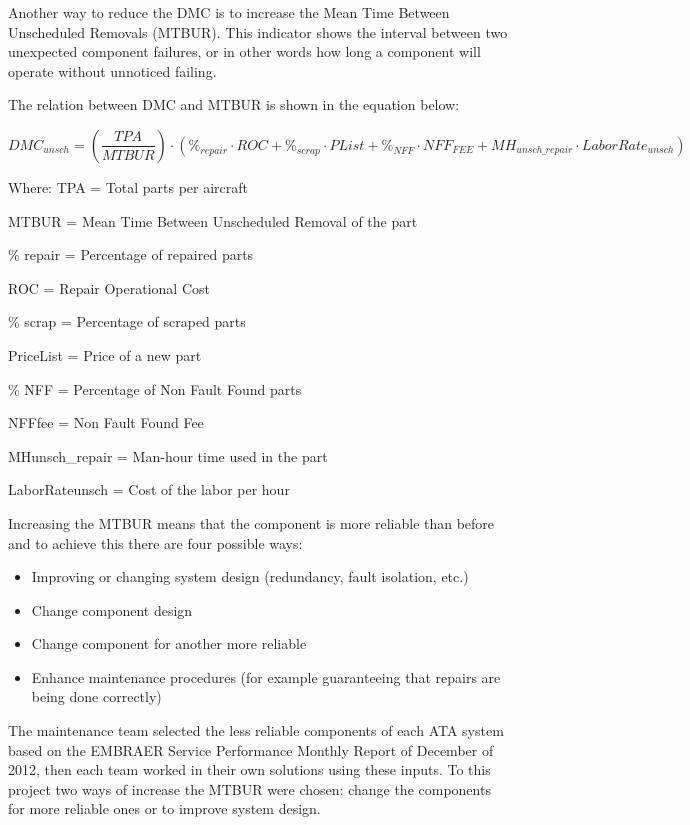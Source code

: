 
Another way to reduce the DMC is to increase the Mean Time Between Unscheduled Removals (MTBUR). This indicator shows the interval between two unexpected component failures, or in other words how long a component will operate without unnoticed failing.

The relation between DMC and MTBUR is shown in the equation below:

\begingroup
\everymath{\scriptstyle}
\scriptsize
\[DMC_{unsch} =\left(\frac{TPA}{MTBUR} \right)\cdot \left(\% _{repair} \cdot ROC+\% _{scrap} \cdot PList+\% _{NFF} \cdot NFF_{FEE} +MH_{unsch\_ repair} \cdot LaborRate_{unsch} \right)\]
\endgroup



Where:
	TPA = Total parts per aircraft

	MTBUR = Mean Time Between Unscheduled Removal of the part

	\% repair = Percentage of repaired parts

	ROC = Repair Operational Cost

	\% scrap = Percentage of scraped parts

	PriceList = Price of a new part

	\% NFF = Percentage of Non Fault Found parts

	NFFfee = Non Fault Found Fee

    MHunsch\_repair = Man-hour time used in the part

    LaborRateunsch = Cost of the labor per hour

Increasing the MTBUR means that the component is more reliable than before and to achieve this there are four possible ways:

\begin{itemize}
	\item Improving or changing system design (redundancy, fault isolation, etc.)
	\item Change component design
	\item Change component for another more reliable
	\item Enhance maintenance procedures (for example guaranteeing that repairs are being done correctly)
\end{itemize}

The maintenance team selected the less reliable components of each ATA system based on the EMBRAER Service Performance Monthly Report of December of 2012, then each team worked in their own solutions using these inputs. To this project two ways of increase the MTBUR were chosen: change the components for more reliable ones or to improve system design.

